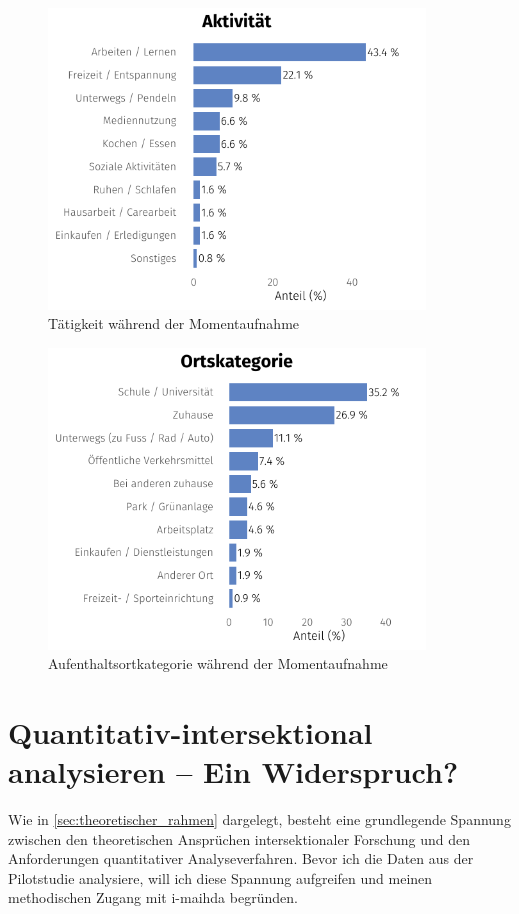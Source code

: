 \begin{figure}[htb]
    \centering
    \includegraphics[width=10cm]{Analyse/Plots/cat_dist_activity.pdf}
    \caption{Tätigkeit während der Momentaufnahme}
    \label{fig:survey_activities}
\end{figure}

\begin{figure}[htb]
    \centering
    \includegraphics[width=10cm]{Analyse/Plots/cat_dist_location_category.pdf}
    \caption{Aufenthaltsortkategorie während der Momentaufnahme}
    \label{fig:survey_locations}
\end{figure}


\section{Quantitativ-intersektional analysieren -- Ein Widerspruch?}

Wie in \cref{sec:theoretischer_rahmen} dargelegt, besteht eine grundlegende Spannung zwischen den theoretischen Ansprüchen intersektionaler Forschung und den Anforderungen quantitativer Analyseverfahren. Bevor ich die Daten aus der Pilotstudie analysiere, will ich diese Spannung aufgreifen und meinen methodischen Zugang mit \gls{i-maihda} begründen.

